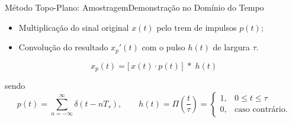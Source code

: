 \begin{frame}{Método Topo-Plano: Amostragem}{Demonstração no Domínio do Tempo}

  \begin{itemize}
    \item Multiplicação do sinal original $x(t)$ pelo trem de impulsos
          $p(t)$;
    \item Convolução do resultado $x_p'(t)$ com o pulso $h(t)$ de
          largura $\tau$.
  \end{itemize}

  \vspace{0.6em}
  \begin{equation}
    x_p(t) = \Big[\, x(t) \cdot p(t) \,\Big] \;*\; h(t)
    \label{eq: modulacao_flattop_tempo}
  \end{equation}

  \vspace{0.2em}
  sendo
  \begin{equation*}
    p(t) = \sum_{n=-\infty}^{\infty} \delta(t - nT_s),
    \qquad
    h(t) = \Pi\!\left(\frac{t}{\tau}\right) =
    \begin{cases}
      1, & 0 \leq t \leq \tau \\[2pt]
      0, & \text{caso contrário.}
    \end{cases}
  \end{equation*}

\end{frame}

